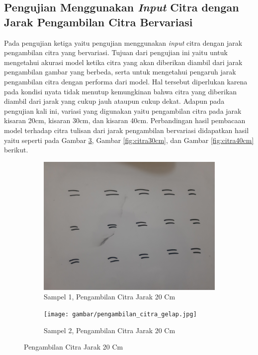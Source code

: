 \subsection{Pengujian Menggunakan \textit{Input} Citra dengan Jarak Pengambilan Citra Bervariasi}
\label{subsec:pengujiancitrabedajarak}

Pada pengujian ketiga yaitu pengujian menggunakan \textit{input} citra dengan jarak pengambilan citra yang bervariasi. Tujuan dari pengujian ini yaitu untuk mengetahui akurasi model ketika citra yang akan diberikan diambil dari jarak pengambilan gambar yang berbeda, serta untuk mengetahui pengaruh jarak pengambilan citra dengan performa dari model. Hal tersebut diperlukan karena pada kondisi nyata tidak menutup kemungkinan bahwa citra yang diberikan diambil dari jarak yang cukup jauh ataupun cukup dekat. Adapun pada pengujian kali ini, variasi yang digunakan yaitu pengambilan citra pada jarak kisaran 20cm, kisaran 30cm, dan kisaran 40cm. Perbandingan hasil pembacaan model terhadap citra tulisan dari jarak pengambilan bervariasi didapatkan hasil yaitu seperti pada Gambar \ref*{fig:citra20cm}, Gambar \ref*{fig:citra30cm}, dan Gambar \ref*{fig:citra40cm} berikut.

\begin{figure}[H]
  \begin{subfigure}{.5\textwidth}
    \centering
    \captionsetup{width=.8\linewidth}
    \includegraphics[width=.85\linewidth]{gambar/pengambilan_citra_terang.jpg}
    \caption{Sampel 1, Pengambilan Citra Jarak 20 Cm}
    \label{fig:citra120cm}
  \end{subfigure}%
  \begin{subfigure}{.5\textwidth}
    \centering
    \captionsetup{width=.8\linewidth}
    \texttt{[image: gambar/pengambilan\_citra\_gelap.jpg]}
    \caption{Sampel 2, Pengambilan Citra Jarak 20 Cm}
    \label{fig:citra220cm}
  \end{subfigure}
  \caption{Pengambilan Citra Jarak 20 Cm}
  \label{fig:citra20cm}
\end{figure}

